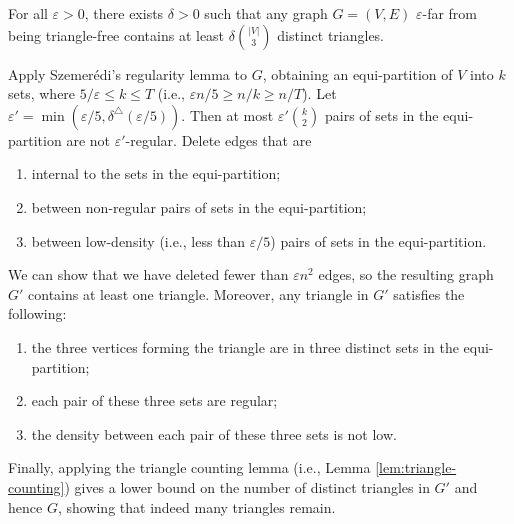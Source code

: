 \documentclass[10pt]{article}
\begin{document}
\begin{algorithm}[h]
  \Accept
  \label{alg:triangle-free}
\end{algorithm}

\begin{theorem}
  For all $\varepsilon > 0$, there exists $\delta > 0$ such that any graph $G = (V, E)$ $\varepsilon$-far from being triangle-free contains at least $\delta\binom{|V|}{3}$ distinct triangles.
\end{theorem}

\begin{proof-sketch}
  Apply Szemer\'edi's regularity lemma to $G$, obtaining an equi-partition of $V$ into $k$ sets, where $5/\varepsilon \leq k \leq T$ (i.e., $\varepsilon n/5 \geq n/k \geq n/T$). Let $\varepsilon' = \min(\varepsilon/5, \delta^\triangle(\varepsilon/5))$. Then at most $\varepsilon' \binom{k}{2}$ pairs of sets in the equi-partition are not $\varepsilon'$-regular. Delete edges that are
  \begin{enumerate}[label=(\roman*), itemsep=0pt]
    \item internal to the sets in the equi-partition;
    \item between non-regular pairs of sets in the equi-partition;
    \item between low-density (i.e., less than $\varepsilon/5$) pairs of sets in the equi-partition.
  \end{enumerate}
  We can show that we have deleted fewer than $\varepsilon n^2$ edges, so the resulting graph $G'$ contains at least one triangle. Moreover, any triangle in $G'$ satisfies the following:
  \begin{enumerate}[label=(\roman*), itemsep=0pt]
    \item the three vertices forming the triangle are in three distinct sets in the equi-partition;
    \item each pair of these three sets are regular;
    \item the density between each pair of these three sets is not low.
  \end{enumerate}
  Finally, applying the triangle counting lemma (i.e., Lemma \ref{lem:triangle-counting}) gives a lower bound on the number of distinct triangles in $G'$ and hence $G$, showing that indeed many triangles remain.
\end{proof-sketch}
\end{document}
